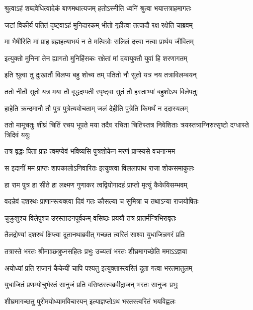 \twolineshloka
{श्रुत्वाऽहं शब्दवेधित्वादेकं बाणमथात्यजम्}
{हतोऽस्मीति ध्वनिं श्रुत्वा भयात्तत्राहमागतः} %

\twolineshloka
{जटां विकीर्य पतितं दृष्ट्वाऽहं मुनिदारकम्}
{भीतो गृहीत्वा तत्पादौ रक्ष रक्षेति चाब्रवम्} %

\twolineshloka
{मा भैषीरिति मां प्राह ब्रह्महत्याभयं न ते}
{मत्पित्रोः सलिलं दत्त्वा नत्वा प्रार्थय जीवितम्} %

\twolineshloka
{इत्युक्तो मुनिना तेन ह्यागतो मुनिहिंसकः}
{रक्षेतां मां दयायुक्तौ युवां हि शरणागतम्} %

\twolineshloka
{इति श्रुत्वा तु दुःखार्तौ विलप्य बहु शोच्य तम्}
{पतितो नौ सुतो यत्र नय तत्राविलम्बयन्} %

\twolineshloka
{ततो नीतौ सुतो यत्र मया तौ वृद्धदम्पती}
{स्पृष्ट्वा सुतं तौ हस्ताभ्यां बहुशोऽथ विलेपतुः} %

\twolineshloka
{हाहेति क्रन्दमानौ तौ पुत्र पुत्रेत्यवोचताम्}
{जलं देहीति पुत्रेति किमर्थं न ददास्यलम्} %

\threelineshloka
{ततो मामूचतुः शीघ्रं चितिं रचय भूपते}
{मया तदैव रचिता चितिस्तत्र निवेशिताः}
{त्रयस्तत्राग्निरुत्सृष्टो दग्धास्ते त्रिदिवं ययुः} %

\twolineshloka
{तत्र वृद्धः पिता प्राह त्वमप्येवं भविष्यसि}
{पुत्रशोकेन मरणं प्राप्स्यसे वचनान्मम} %

\twolineshloka
{स इदानीं मम प्राप्तः शापकालोऽनिवारितः}
{इत्युक्त्वा विललापाथ राजा शोकसमाकुलः} %

\twolineshloka
{हा राम पुत्र हा सीते हा लक्ष्मण गुणाकर}
{त्वद्वियोगादहं प्राप्तो मृत्युं कैकेयिसम्भवम्} %

\twolineshloka
{वदन्नेवं दशरथः प्राणान्स्त्यक्त्वा दिवं गतः}
{कौसल्या च सुमित्रा च तथाऽन्या राजयोषितः} %

\twolineshloka
{चुक्रुशुश्च विलेपुश्च उरस्ताडनपूर्वकम्}
{वसिष्ठः प्रययौ तत्र प्रातर्मन्त्रिभिरावृतः} %

\twolineshloka
{तैलद्रोण्यां दशरथं क्षिप्त्वा दूतानथाब्रवीत्}
{गच्छत त्वरितं साश्वा युधाजिन्नगरं प्रति} %

\twolineshloka
{तत्रास्ते भरतः श्रीमाञ्छत्रुघ्नसहितः प्रभुः}
{उच्यतां भरतः शीघ्रमागच्छेति ममाऽऽज्ञया} %

\twolineshloka
{अयोध्यां प्रति राजानं कैकेयीं चापि पश्यतु}
{इत्युक्तास्त्वरितं दूता गत्वा भरतमातुलम्} %

\twolineshloka
{युधाजितं प्रणम्योचुर्भरतं सानुजं प्रति}
{वसिष्ठस्त्वब्रवीद्राजन् भरतः सानुजः प्रभुः} %

\twolineshloka
{शीघ्रमागच्छतु पुरीमयोध्यामविचारयन्}
{इत्याज्ञप्तोऽथ भरतस्त्वरितं भयविह्वलः} %

